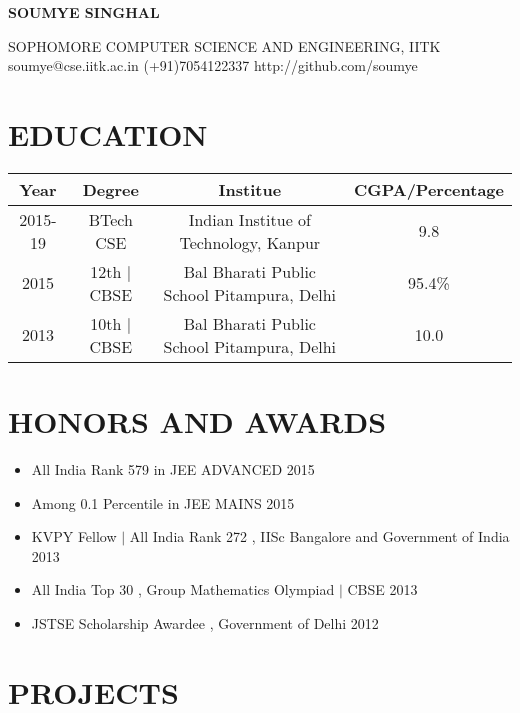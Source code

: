 \documentclass{article}
\begin{document}
    \centerline{\Huge{\textbf{SOUMYE SINGHAL}}}
    \begin{center}
    \textup{
        SOPHOMORE {\large\textperiodcentered} COMPUTER SCIENCE AND ENGINEERING, IITK\\
    }
    soumye@cse.iitk.ac.in {\large\textperiodcentered} (+91)7054122337 {\large\textperiodcentered} http://github.com/soumye
    \end{center}


\begin{table}[h]
\section*{EDUCATION}
    \begin{tabular}{ |c|c|c|c| } 
        \hline
        Year & Degree & Institue & CGPA/Percentage \\ 
        \hline
        2015-19 & BTech CSE & Indian Institue of Technology, Kanpur & 9.8\\ 
        2015 & 12th $|$ CBSE & Bal Bharati Public School Pitampura, Delhi & 95.4\%\\ 
        2013 & 10th $|$ CBSE & Bal Bharati Public School Pitampura, Delhi & 10.0\\        
        \hline
    \end{tabular}
\end{table}

\section*{HONORS AND AWARDS}
\begin{itemize}
    \itemsep0em
    \item All India Rank 579 in JEE ADVANCED \hfill 2015
    \item Among 0.1 Percentile in JEE MAINS \hfill 2015
    \item KVPY Fellow $|$ All India Rank 272 , IISc Bangalore and Government of India \hfill 2013
    \item All India Top 30 , Group Mathematics Olympiad $|$ CBSE \hfill 2013
    \item JSTSE Scholarship Awardee , Government of Delhi   \hfill 2012 
    \end{itemize}
\section*{PROJECTS}
\end{document}

